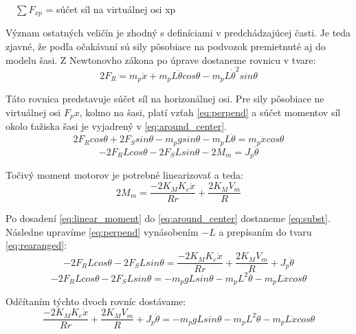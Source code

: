 $\quad \sum{F_{xp}}$ = súčet síl na virtuálnej osi xp

Význam ostatných veličín je zhodný s definíciami v predchádzajúcej časti. Je teda zjavné, že podľa očakávaní sú sily pôsobiace na podvozok premietnuté aj do modelu šasi. Z Newtonovho zákona po úprave dostaneme rovnicu v tvare:
\begin{equation}
2F_R = m_p \ddot{x} + m_p L \ddot{\theta} cos{\theta} - m_p L\dot{\theta}^2 sin\theta
\label{eq:horizontal}
\end{equation}

Táto rovnica predstavuje súčet síl na horizonálnej osi. Pre sily pôsobiace ne virtuálnej osi $F_px$, kolmo na šasi, platí vzťah \eqref{eq:perpend} a súčet momentov síl okolo ťažiska šasi je vyjadrený v \eqref{eq:around_center}.
\begin{equation}
2F_R cos\theta + 2F_S sin\theta - m_p g sin\theta - m_p L \ddot{\theta} = m_p \ddot{x}cos\theta
\label{eq:perpend}
\end{equation}
\begin{equation}
-2F_R L cos\theta - 2F_S L sin\theta - 2M_m = J_p \ddot{\theta}
\label{eq:around_center}
\end{equation}

Točivý moment motorov je potrebné linearizovať a teda:
\begin{equation}
2M_m = \dfrac{-2K_M K_e \dot{x}}{Rr} + \dfrac{2K_M V_m}{R}
\label{eq:linear_moment}
\end{equation}

Po dosadení \eqref{eq:linear_moment} do \eqref{eq:around_center} dostaneme \eqref{eq:subst}. Následne upravíme \eqref{eq:perpend} vynásobením $-L$ a prepísaním do tvaru \eqref{eq:rearanged}:
\begin{equation}
-2F_R L cos\theta - 2F_S L sin\theta = \dfrac{-2K_M K_e \dot{x}}{Rr} + \dfrac{2K_M V_m}{R} + J_p\ddot{\theta}
\label{eq:subst}
\end{equation}
\begin{equation}
-2F_R L cos\theta - 2F_S L sin\theta = -m_p g L sin\theta - m_p L^2 \ddot{\theta} - m_p L \ddot{x} cos\theta
\label{eq:rearanged}
\end{equation}

Odčítaním týchto dvoch rovníc dostávame:
\begin{equation}
\dfrac{-2K_M K_e \dot{x}}{Rr} + \dfrac{2K_M V_m}{R} + J_p\ddot{\theta} = -m_p g L sin\theta - m_p L^2\ddot{\theta} - m_p L \ddot{x} cos\theta
\label{eq:chasis}
\end{equation}

